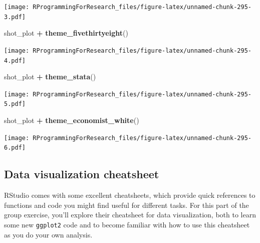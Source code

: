 \documentclass[]{book}
\makeatletter
\newenvironment{Shaded}{\begin{snugshade}}{\end{snugshade}}
\newcommand{\KeywordTok}[1]{\textcolor[rgb]{0.13,0.29,0.53}{\textbf{#1}}}
\newcommand{\StringTok}[1]{\textcolor[rgb]{0.31,0.60,0.02}{#1}}
\newcommand{\OperatorTok}[1]{\textcolor[rgb]{0.81,0.36,0.00}{\textbf{#1}}}
\newcommand{\NormalTok}[1]{#1}
\newenvironment{kframe}{%
\medskip{}
\setlength{\fboxsep}{.8em}
 \def\at@end@of@kframe{}%
 \ifinner\ifhmode%
  \def\at@end@of@kframe{\end{minipage}}%
  \begin{minipage}{\columnwidth}%
 \fi\fi%
 \def\FrameCommand##1{\hskip\@totalleftmargin \hskip-\fboxsep
 \colorbox{shadecolor}{##1}\hskip-\fboxsep
     \hskip-\linewidth \hskip-\@totalleftmargin \hskip\columnwidth}%
 \MakeFramed {\advance\hsize-\width
   \@totalleftmargin\z@ \linewidth\hsize
   \@setminipage}}%
 {\par\unskip\endMakeFramed%
 \at@end@of@kframe}
\renewenvironment{Shaded}{\begin{kframe}}{\end{kframe}}
\theoremstyle{definition}
\theoremstyle{definition}
\theoremstyle{definition}
\theoremstyle{remark}
\makeatother
\begin{document}
\texttt{[image: RProgrammingForResearch\_files/figure-latex/unnamed-chunk-295-3.pdf]}

\begin{Shaded}
\begin{Highlighting}[]
\NormalTok{shot_plot }\OperatorTok{+}\StringTok{ }\KeywordTok{theme_fivethirtyeight}\NormalTok{()}
\end{Highlighting}
\end{Shaded}

\texttt{[image: RProgrammingForResearch\_files/figure-latex/unnamed-chunk-295-4.pdf]}

\begin{Shaded}
\begin{Highlighting}[]
\NormalTok{shot_plot }\OperatorTok{+}\StringTok{ }\KeywordTok{theme_stata}\NormalTok{()}
\end{Highlighting}
\end{Shaded}

\texttt{[image: RProgrammingForResearch\_files/figure-latex/unnamed-chunk-295-5.pdf]}

\begin{Shaded}
\begin{Highlighting}[]
\NormalTok{shot_plot }\OperatorTok{+}\StringTok{ }\KeywordTok{theme_economist_white}\NormalTok{()}
\end{Highlighting}
\end{Shaded}

\texttt{[image: RProgrammingForResearch\_files/figure-latex/unnamed-chunk-295-6.pdf]}

\subsection{Data visualization
cheatsheet}\label{data-visualization-cheatsheet}

RStudio comes with some excellent cheatsheets, which provide quick
references to functions and code you might find useful for different
tasks. For this part of the group exercise, you'll explore their
cheatsheet for data visualization, both to learn some new
\texttt{ggplot2} code and to become familiar with how to use this
cheatsheet as you do your own analysis.
\end{document}
